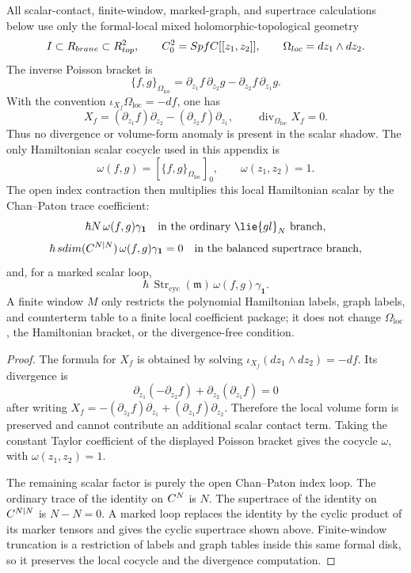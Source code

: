 \begin{prop}
\label{prop:app-local-geometry-scalar-shadow}
  All scalar-contact, finite-window, marked-graph, and supertrace
  calculations below use only the formal-local mixed
  holomorphic-topological geometry
  \[
    I\subset R_{brane}\subset R^2_{top},
    \qquad
    C^2_0=SpfC[[z_1,z_2]],
    \qquad
    \Omega_{loc}=dz_1\wedge dz_2 .
  \]
  The inverse Poisson bracket is
  \[
    \{f,g\}_{\Omega_{\mathrm{loc}}}
      =
    \partial_{z_1}f\,\partial_{z_2}g
      -
    \partial_{z_2}f\,\partial_{z_1}g .
  \]
  With the convention
  \(\iota_{X_f}\Omega_{\mathrm{loc}}=-df\), one has
  \[
    X_f=(\partial_{z_1}f)\partial_{z_2}
        -(\partial_{z_2}f)\partial_{z_1},
    \qquad
    \operatorname{div}_{\Omega_{\mathrm{loc}}}X_f=0 .
  \]
  Thus no divergence or volume-form anomaly is present in the scalar
  shadow.  The only Hamiltonian scalar cocycle used in this appendix is
  \[
    \omega(f,g)
      =
    [\{f,g\}_{\Omega_{\mathrm{loc}}}]_0,
    \qquad
    \omega(z_1,z_2)=1 .
  \]
  The open index contraction then multiplies this local Hamiltonian scalar
  by the Chan--Paton trace coefficient:
  \[
    \hbar N\,\omega(f,g)\gamma_{\mathbf 1}
    \quad\text{in the ordinary }\lie{gl}_N\text{ branch},
  \]
  \[
    \hbar\,sdim(C^{N|N})\,
    \omega(f,g)\gamma_{\mathbf 1}=0
    \quad\text{in the balanced supertrace branch},
  \]
  and, for a marked scalar loop,
  \[
    \hbar\,\operatorname{Str}_{\mathrm{cyc}}(\mathfrak m)\,
    \omega(f,g)\gamma_{\mathbf 1}.
  \]
  A finite window \(M\) only restricts the polynomial Hamiltonian labels,
  graph labels, and counterterm table to a finite local coefficient
  package; it does not change
  \(\Omega_{\mathrm{loc}}\), the Hamiltonian bracket, or the
  divergence-free condition.
\end{prop}

\begin{proof}
  The formula for \(X_f\) is obtained by solving
  \(\iota_{X_f}(dz_1\wedge dz_2)=-df\).  Its divergence is
  \[
    \partial_{z_1}(-\partial_{z_2}f)
      +\partial_{z_2}(\partial_{z_1}f)=0
  \]
  after writing \(X_f=-(\partial_{z_2}f)\partial_{z_1}
  +(\partial_{z_1}f)\partial_{z_2}\).  Therefore the local volume form
  is preserved and cannot contribute an additional scalar contact term.
  Taking the constant Taylor coefficient of the displayed Poisson bracket
  gives the cocycle \(\omega\), with \(\omega(z_1,z_2)=1\).

  The remaining scalar factor is purely the open Chan--Paton index loop.
  The ordinary trace of the identity on \(C^N\) is \(N\).  The supertrace
  of the identity on \(C^{N|N}\) is \(N-N=0\).  A marked loop replaces
  the identity by the cyclic product of its marker tensors and gives the
  cyclic supertrace shown above.  Finite-window truncation is a restriction
  of labels and graph tables inside this same formal disk, so it preserves
  the local cocycle and the divergence computation.
\end{proof}

